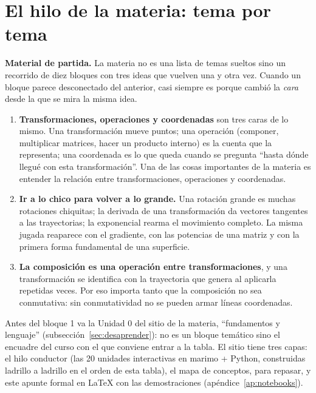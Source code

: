 \section{El hilo de la materia: tema por tema}\label{cap:02}\label{sec:hilo}

\textbf{Material de partida.} La materia no es una lista de temas sueltos sino un
recorrido de diez bloques con tres ideas que vuelven una y otra vez. Cuando un bloque parece
desconectado del anterior, casi siempre es porque cambió la \emph{cara} desde la que se mira
la misma idea.

\begin{idea}
\begin{enumerate}
  \item \textbf{Transformaciones, operaciones y coordenadas} son tres caras de lo mismo. Una
  transformación mueve puntos; una operación (componer, multiplicar matrices, hacer un
  producto interno) es la cuenta que la representa; una coordenada es lo que queda cuando se
  pregunta ``hasta dónde llegué con esta transformación''. Una de las cosas importantes de
  la materia es entender la relación entre transformaciones, operaciones y coordenadas.
  \item \textbf{Ir a lo chico para volver a lo grande.} Una rotación grande es muchas
  rotaciones chiquitas; la derivada de una transformación da vectores tangentes a las
  trayectorias; la exponencial rearma el movimiento completo. La misma jugada reaparece con
  el gradiente, con las potencias de una matriz y con la primera forma fundamental de una
  superficie.
  \item \textbf{La composición es una operación entre transformaciones}, y una
  transformación se identifica con la trayectoria que genera al aplicarla repetidas veces.
  Por eso importa tanto que la composición no sea conmutativa: sin conmutatividad no se
  pueden armar líneas coordenadas.
\end{enumerate}
\end{idea}

Antes del bloque 1 va la Unidad 0 del sitio de la materia, ``fundamentos y lenguaje''
(subsección~\ref{sec:desaprender}): no es un bloque temático sino
el encuadre del curso con el que conviene entrar a la tabla. El sitio tiene tres capas: el
hilo conductor (las 20 unidades interactivas en marimo + Python, construidas ladrillo a
ladrillo en el orden de esta tabla), el mapa de conceptos, para repasar, y este apunte
formal en \LaTeX{} con las demostraciones (apéndice~\ref{ap:notebooks}).


